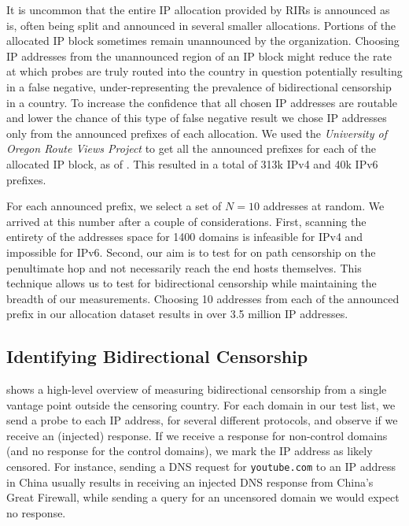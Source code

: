 It is uncommon that the entire IP allocation provided by RIRs is announced as
is, often being split and announced in several smaller allocations. Portions of
the allocated IP block sometimes remain unannounced by the organization.
Choosing IP addresses from the unannounced region of an IP block might reduce
the rate at which probes are truly routed into the country in question
potentially resulting in a false negative, under-representing the prevalence of
bidirectional censorship in a country. To increase the confidence that all
chosen IP addresses are routable and lower the chance of this type of false
negative result we chose IP addresses only from the announced prefixes of each
allocation. We used the \textit{University of Oregon Route Views Project}
\cite{RouteVie20:online} to get all the announced prefixes for each of the
allocated IP block, as of . This resulted in a total of 313k IPv4 and 40k IPv6 prefixes.


For each announced prefix, we select a set of $N=10$ addresses at random. We
arrived at this number after a couple of considerations. First, scanning the
entirety of the addresses space for 1400 domains is infeasible for IPv4 and
impossible for IPv6. Second, our aim is to test for on path censorship on the
penultimate hop and not necessarily reach the end hosts themselves. This
technique allows us to test for bidirectional censorship while maintaining the
breadth of our measurements. Choosing 10 addresses from each of the announced
prefix in our allocation dataset results in over 3.5 million IP addresses.

\subsection{Identifying Bidirectional Censorship}
\label{sec:methodology:censorship}


\textbf{}
shows a high-level overview of measuring bidirectional censorship from a single vantage point
outside the censoring country.
For each domain in our test list, we send a probe to each IP address, for several different protocols,
and observe if we receive an (injected) response. If we receive a response for
non-control domains (and no response for the control domains), we mark the IP
address as likely censored. For instance, sending a DNS request for
\texttt{youtube.com} to an IP address
in China usually results in receiving an injected DNS response from China's
Great Firewall, while sending a query for an uncensored domain we would expect
no response.

